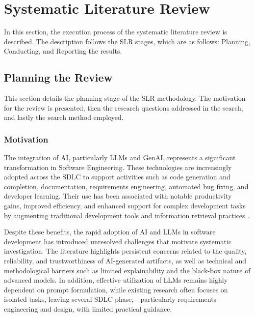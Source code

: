 \section{Systematic Literature Review}

In this section, the execution process of the systematic literature review is described. The description follows
the SLR stages, which are as follows: Planning, Conducting, and Reporting the results.

\subsection{Planning the Review}

This section details the planning stage of the SLR methodology. The motivation for the review is presented, then
the research questions addressed in the search, and lastly the search method employed.

\subsubsection{Motivation}

The integration of AI, particularly LLMs and GenAI, represents a significant transformation in Software Engineering. These technologies are increasingly adopted across the SDLC to support activities such as code generation and completion, documentation, requirements engineering, automated bug fixing, and developer learning. Their use has been associated with notable productivity gains, improved efficiency, and enhanced support for complex development tasks by augmenting traditional development tools and information retrieval practices \cite{Ahmed:2025ai, Zhang:2025ea, Durrani:2024ad, Jabrw:2025ss, Banh:2025cf, Farhanna:2025eu, KarlovsKarlovskis:2024ga, Terragni:2025fa}.

Despite these benefits, the rapid adoption of AI and LLMs in software development has introduced unresolved challenges that motivate systematic investigation. The literature highlights persistent concerns related to the quality, reliability, and trustworthiness of AI-generated artifacts, as well as technical and methodological barriers such as limited explainability and the black-box nature of advanced models. In addition, effective utilization of LLMs remains highly dependent on prompt formulation, while existing research often focuses on isolated tasks, leaving several SDLC phase,—particularly requirements engineering and design, with limited practical guidance.

